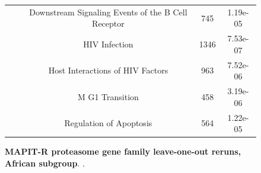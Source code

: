 \documentclass[12pt,a4paper]{article}
\begin{document}
\begin{figure}[ht]
{{\begin{tabular}{cc|ccc}
 & & Downstream Signaling Events of the B Cell Receptor & 745 & 1.19e-05 \\
 & & HIV Infection & 1346 & 7.53e-07 \\
 & & Host Interactions of HIV Factors & 963 & 7.52e-06 \\
 & & M G1 Transition & 458 & 3.19e-06 \\
 & & Regulation of Apoptosis & 564 & 1.22e-05 \\
  \hline
\end{tabular}}}
\caption[TBD]{\textbf{MAPIT-R proteasome gene family leave-one-out reruns, African subgroup}. .}
\label{InterPath-Supp-Figure-Prot-Heatplots-African}
\end{figure}
\clearpage
\addtocounter{figure}{-1}
\addtocounter{CharNumber5}{1}

\end{document}

